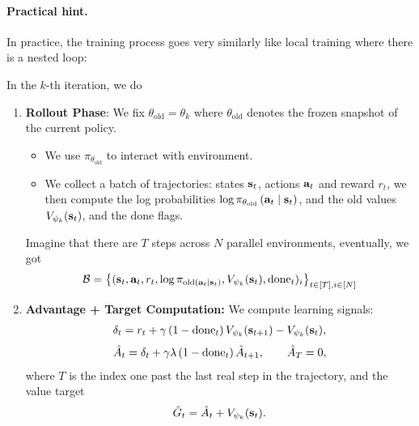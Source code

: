\documentclass[11pt]{article}  %
\begin{document}
\paragraph{Practical hint.} 
In practice, the training process goes very similarly like local training where there is a nested loop:

In the $k$-th iteration, we do 
\begin{enumerate}
  \item \textbf{Rollout Phase}: We fix $\theta_{\text{old}} = \theta_{k}$ where $\theta_{\text{old}}$ denotes the frozen snapshot of the current policy.
  \begin{itemize}
    \item We use $\pi_{\theta_{\text{old}}}$ to interact with environment.
    \item We collect a batch of trajectories: states $\mathbf{s}_t$, actions $\mathbf{a}_t$ and reward $r_t$, we then compute the log probabilities $\log \pi_{\theta_{\text{old}}}\left( \mathbf{a}_t \mid \mathbf{s}_t \right)$, and the old values $V_{\psi_k}(\mathbf{s}_t)$, and the done flags.
  \end{itemize} 
  Imagine that there are $T$ steps across $N$ parallel environments, eventually, we got 
  \begin{align*}
    \mathcal{B} = \left\{ (\mathbf{s}_t, \mathbf{a}_t, r_t, \log \pi_{\text{old}(\mathbf{a}_t \mid \mathbf{s}_t)}, V_{\psi_k}(\mathbf{s}_t), \text{done}_t)_i \right\}_{t \in [T], i \in [N]}
  \end{align*}

  \item \textbf{Advantage + Target Computation:} 
  We compute learning signals: 
  \begin{align*}
    \delta_t = r_t + \gamma\left( 1 - \text{done}_t \right)V_{\psi_k}(\mathbf{s}_{t+1}) - V_{\psi_k}(\mathbf{s}_t),
  \end{align*}
  \begin{align*}
    \hat{A}_t = \delta_t + \gamma\lambda\left( 1 - \text{done}_t \right)\hat{A}_{t+1}, \qquad \hat{A}_{T} = 0,
  \end{align*}
  where $T$ is the index one past the last real step in the trajectory, and the value target 
  \begin{align*}
    \hat{G}_t = \hat{A}_t + V_{\psi_k}(\mathbf{s}_t).
  \end{align*}


\end{enumerate}
\end{document}
